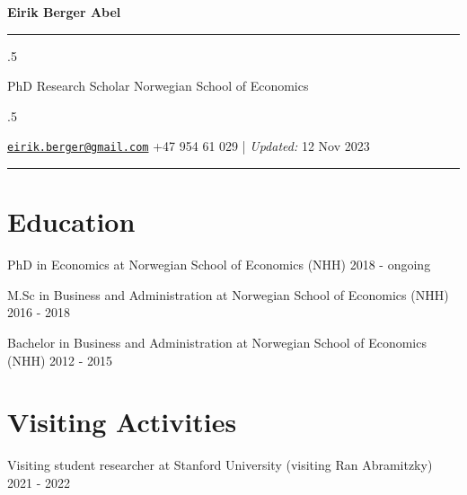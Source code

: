\documentclass[11pt,]{article}
\begin{document}
\centerline{\huge \bf Eirik Berger Abel}

\vspace{2 mm}

\hrule

\vspace{2 mm}

\moveleft.5\hoffset\centerline{PhD Research Scholar \textbar{} Norwegian
School of Economics}

\moveleft.5\hoffset\centerline{ \faEnvelopeO \hspace{1 mm} \href{mailto:}{\tt \href{mailto:eirik.berger@gmail.com}{\nolinkurl{eirik.berger@gmail.com}}} \hspace{1 mm}  \faPhone \hspace{1 mm}  +47
954 61 029  \hspace{1 mm}         | \emph{Updated:} 12 Nov 2023}



\vspace{2 mm}

\hrule



\hypertarget{education}{%
\section{Education}\label{education}}

PhD in Economics at Norwegian School of Economics (NHH) \hfill 2018 -
ongoing\vspace{-0.2cm}

M.Sc in Business and Administration at Norwegian School of Economics
(NHH) \hfill 2016 - 2018\vspace{-0.2cm}

Bachelor in Business and Administration at Norwegian School of Economics
(NHH) \hfill 2012 - 2015\vspace{-0.2cm}

\vspace{0.5cm}

\hypertarget{visiting-activities}{%
\section{Visiting Activities}\label{visiting-activities}}

Visiting student researcher at Stanford University (visiting Ran
Abramitzky) \hfill 2021 - 2022\vspace{-0.2cm}

\vspace{0.5cm}
\end{document}
